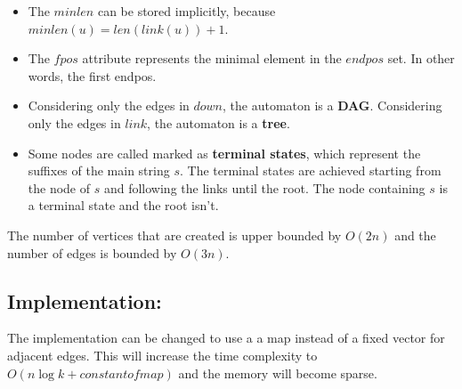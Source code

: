 \begin{itemize}
        \item The $minlen$ can be stored implicitly, because $minlen(u) = len(link(u)) + 1$.

        \item The $fpos$ attribute represents the minimal element in the $endpos$ set. In other words, the first endpos.

        \item Considering only the edges in $down$, the automaton is a \textbf{DAG}. Considering only the edges in $link$, the automaton is a \textbf{tree}.

        \item Some nodes are called marked as \textbf{terminal states}, which represent the suffixes of the main string $s$. 
        The terminal states are achieved starting from the node of $s$ and following the links until the root. 
        The node containing $s$ is a terminal state and the root isn't.

    \end{itemize}

    The number of vertices that are created is upper bounded by \textbf{$O(2n)$} and the number of edges is bounded by \textbf{$O(3n)$}.

    \subsection{Implementation:}

    The implementation can be changed to use a a map instead of a fixed vector for adjacent edges.
    This will increase the time complexity to $O(n \log{k} + constant of map)$ and the memory will become sparse.

